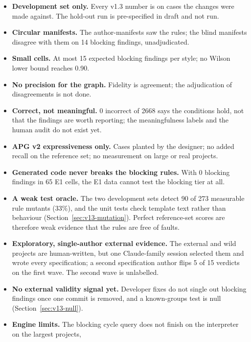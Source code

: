 \documentclass[10pt,a4paper]{article}
\begin{document}
\begin{itemize}
  \item \textbf{Development set only.} Every v1.3 number is on cases the changes were made against. The hold-out
        run is pre-specified in draft and not run.
  \item \textbf{Circular manifests.} The author-manifests saw the rules; the blind manifests disagree with them on
        14 blocking findings, unadjudicated. %
  \item \textbf{Small cells.} At most 15 expected blocking findings per style; no Wilson lower bound reaches 0.90.
  \item \textbf{No precision for the graph.} Fidelity is agreement; the adjudication of disagreements is not done.
  \item \textbf{Correct, not meaningful.} 0 incorrect of 2668 says the conditions hold, not that the findings are
        worth reporting; the meaningfulness labels and the human audit do not exist yet.
  \item \textbf{APG v2 expressiveness only.} Cases planted by the designer; no added recall on the reference set;
        no measurement on large or real projects.
  \item \textbf{Generated code never breaks the blocking rules.} With 0 blocking findings in 65 E1 cells, the E1
        data cannot test the blocking tier at all.
  \item \textbf{A weak test oracle.} The two development sets detect 90 of 273 measurable rule mutants (33\%), and
        the unit tests check template text rather than behaviour (Section~\ref{sec:v13-mutation}). Perfect
        reference-set scores are therefore weak evidence that the rules are free of faults.
  \item \textbf{Exploratory, single-author external evidence.} The external and wild projects are human-written,
        but one Claude-family session selected them and wrote every specification; a second specification author
        flips 5 of 15 verdicts on the first wave. The second wave is unlabelled.
  \item \textbf{No external validity signal yet.} Developer fixes do not single out blocking findings once one
        commit is removed, and a known-groups test is null (Section~\ref{sec:v13-null}).
  \item \textbf{Engine limits.} The blocking cycle query does not finish on the interpreter on the largest projects,

\end{itemize}
\end{document}
